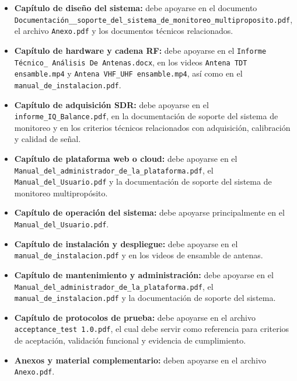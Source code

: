 \begin{itemize}
    \item \textbf{Capítulo de diseño del sistema:} debe apoyarse en el documento \texttt{Documentación\_\_soporte\_del\_sistema\_de\_monitoreo\_multiproposito.pdf}, el archivo \texttt{Anexo.pdf} y los documentos técnicos relacionados.
    
    \item \textbf{Capítulo de hardware y cadena RF:} debe apoyarse en el \texttt{Informe Técnico\_ Análisis De Antenas.docx}, en los videos \texttt{Antena TDT ensamble.mp4} y \texttt{Antena VHF\_UHF ensamble.mp4}, así como en el \texttt{manual\_de\_instalacion.pdf}.
    
    \item \textbf{Capítulo de adquisición SDR:} debe apoyarse en el \texttt{informe\_IQ\_Balance.pdf}, en la documentación de soporte del sistema de monitoreo y en los criterios técnicos relacionados con adquisición, calibración y calidad de señal.
    
    \item \textbf{Capítulo de plataforma web o cloud:} debe apoyarse en el \texttt{Manual\_del\_administrador\_de\_la\_plataforma.pdf}, el \texttt{Manual\_del\_Usuario.pdf} y la documentación de soporte del sistema de monitoreo multipropósito.
    
    \item \textbf{Capítulo de operación del sistema:} debe apoyarse principalmente en el \texttt{Manual\_del\_Usuario.pdf}.
    
    \item \textbf{Capítulo de instalación y despliegue:} debe apoyarse en el \texttt{manual\_de\_instalacion.pdf} y en los videos de ensamble de antenas.
    
    \item \textbf{Capítulo de mantenimiento y administración:} debe apoyarse en el \texttt{Manual\_del\_administrador\_de\_la\_plataforma.pdf}, el \texttt{manual\_de\_instalacion.pdf} y la documentación de soporte del sistema.
    
    \item \textbf{Capítulo de protocolos de prueba:} debe apoyarse en el archivo \texttt{acceptance\_test 1.0.pdf}, el cual debe servir como referencia para criterios de aceptación, validación funcional y evidencia de cumplimiento.
    
    \item \textbf{Anexos y material complementario:} deben apoyarse en el archivo \texttt{Anexo.pdf}.
\end{itemize}

